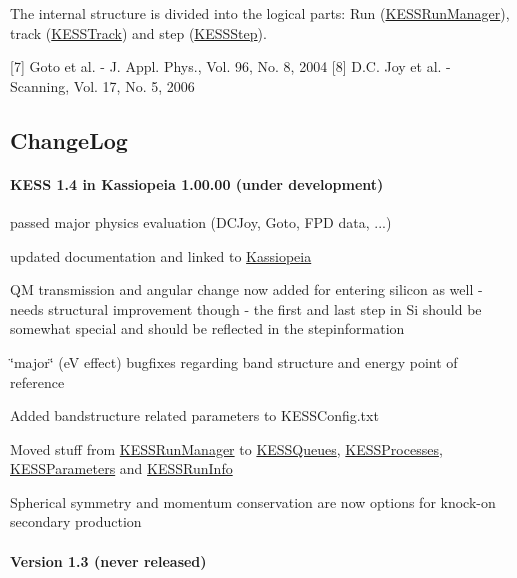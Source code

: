 The internal structure is divided into the logical parts: Run (\hyperlink{class_kassiopeia_1_1_k_e_s_s_run_manager}{KESSRunManager}), track (\hyperlink{class_kassiopeia_1_1_k_e_s_s_track}{KESSTrack}) and step (\hyperlink{class_kassiopeia_1_1_k_e_s_s_step}{KESSStep}).

\mbox{[}7\mbox{]} Goto et al. -\/ J. Appl. Phys., Vol. 96, No. 8, 2004 \mbox{[}8\mbox{]} D.C. Joy et al. -\/ Scanning, Vol. 17, No. 5, 2006 \hypertarget{KESSChangelog}{}\subsection{ChangeLog}\label{KESSChangelog}
\hypertarget{_k_e_s_s_changelog_v14}{}\paragraph{KESS 1.4 in Kassiopeia 1.00.00 (under development)}\label{_k_e_s_s_changelog_v14}

\begin{DoxyItemize}
\item passed major physics evaluation (DCJoy, Goto, FPD data, ...)
\item updated documentation and linked to \hyperlink{namespace_kassiopeia}{Kassiopeia}
\item QM transmission and angular change now added for entering silicon as well -\/ needs structural improvement though -\/ the first and last step in Si should be somewhat special and should be reflected in the stepinformation
\item \char`\"{}major\char`\"{} (eV effect) bugfixes regarding band structure and energy point of reference
\item Added bandstructure related parameters to KESSConfig.txt
\item Moved stuff from \hyperlink{class_kassiopeia_1_1_k_e_s_s_run_manager}{KESSRunManager} to \hyperlink{class_kassiopeia_1_1_k_e_s_s_queues}{KESSQueues}, \hyperlink{class_kassiopeia_1_1_k_e_s_s_processes}{KESSProcesses}, \hyperlink{class_kassiopeia_1_1_k_e_s_s_parameters}{KESSParameters} and \hyperlink{class_kassiopeia_1_1_k_e_s_s_run_info}{KESSRunInfo}
\item Spherical symmetry and momentum conservation are now options for knock-\/on secondary production
\end{DoxyItemize}\hypertarget{_k_e_s_s_changelog_v13}{}\paragraph{Version 1.3 (never released)}\label{_k_e_s_s_changelog_v13}

